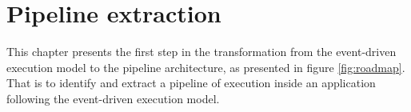 \chapter{Pipeline extraction} \label{chapter5}
\minitoc
\eject

This chapter presents the first step in the transformation from the event-driven execution model to the pipeline architecture, as presented in figure \ref{fig:roadmap}.
That is to identify and extract a pipeline of execution inside an application following the event-driven execution model.
%
%
%

